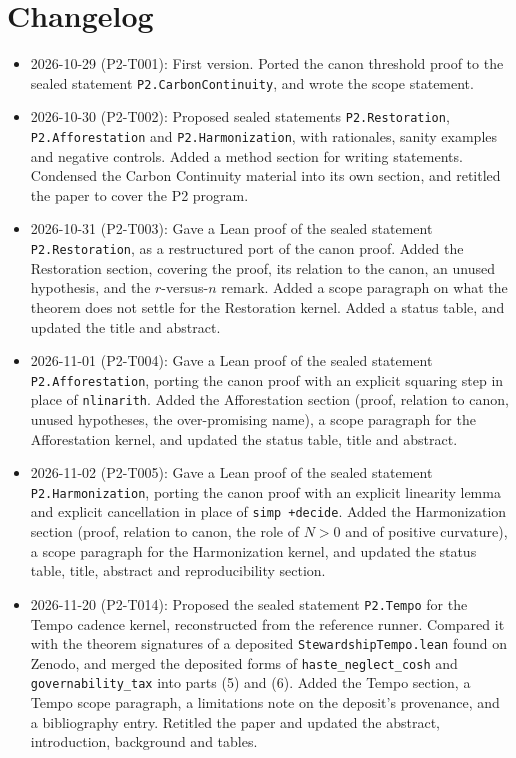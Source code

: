 \documentclass[11pt]{article}
\theoremstyle{definition}
\theoremstyle{remark}
\begin{document}
\section{Changelog}
\begin{itemize}
\item 2026-10-29 (P2-T001): First version. Ported the canon threshold proof to the sealed statement
\texttt{P2.CarbonContinuity}, and wrote the scope statement.
\item 2026-10-30 (P2-T002): Proposed sealed statements \texttt{P2.Restoration}, \texttt{P2.Afforestation} and \texttt{P2.Harmonization},
with rationales, sanity examples and negative controls. Added a method section for writing statements.
Condensed the Carbon Continuity material into its own section, and retitled the paper to cover the P2 program.
\item 2026-10-31 (P2-T003): Gave a Lean proof of the sealed statement \texttt{P2.Restoration}, as a restructured port of the canon
proof. Added the Restoration section, covering the proof, its relation to the canon, an unused hypothesis, and the $r$-versus-$n$ remark.
Added a scope paragraph on what the theorem does not settle for the Restoration kernel. Added a status table, and updated the title and abstract.
\item 2026-11-01 (P2-T004): Gave a Lean proof of the sealed statement \texttt{P2.Afforestation}, porting the canon proof with
an explicit squaring step in place of \texttt{nlinarith}. Added the Afforestation section (proof, relation to canon, unused hypotheses,
the over-promising name), a scope paragraph for the Afforestation kernel, and updated the status table, title and abstract.
\item 2026-11-02 (P2-T005): Gave a Lean proof of the sealed statement \texttt{P2.Harmonization}, porting the canon proof with an
explicit linearity lemma and explicit cancellation in place of \texttt{simp +decide}. Added the Harmonization section (proof,
relation to canon, the role of $N>0$ and of positive curvature), a scope paragraph for the Harmonization kernel, and updated the
status table, title, abstract and reproducibility section.
\item 2026-11-20 (P2-T014): Proposed the sealed statement \texttt{P2.Tempo} for the Tempo cadence kernel, reconstructed from the
reference runner. Compared it with the theorem signatures of a deposited \texttt{StewardshipTempo.lean} found on Zenodo, and
merged the deposited forms of \texttt{haste\_neglect\_cosh} and \texttt{governability\_tax} into parts (5) and (6).
Added the Tempo section, a Tempo scope paragraph, a limitations note on the deposit's provenance, and a bibliography entry.
Retitled the paper and updated the abstract, introduction, background and tables.
\end{itemize}



\end{document}
